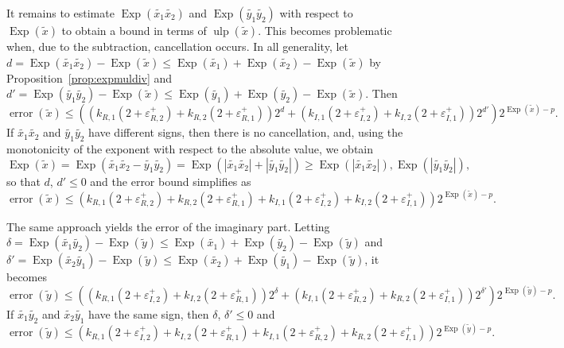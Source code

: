 \documentclass [11pt]{article}
\newcommand {\appro}[1]{\widetilde {#1}}
\newcommand {\Ulp}{{\operatorname {ulp}}}
\DeclareMathOperator{\Exp}{\operatorname {Exp}}
\newcommand{\error}{\operatorname {error}}
\renewcommand {\epsilon}{\varepsilon}
\renewcommand {\leq}{\leqslant}
\renewcommand {\geq}{\geqslant}
\begin{document}
It remains to estimate $\Exp (\appro {x_1} \appro {x_2})$ and
$\Exp (\appro {y_1} \appro {y_2})$ with respect to $\Exp (\appro x)$ to obtain
a bound in terms of $\Ulp (\appro x)$. This becomes problematic when, due
to the subtraction, cancellation occurs. In all generality, let
$d = \Exp (\appro {x_1} \appro {x_2}) - \Exp (\appro x)
\leq \Exp (\appro {x_1}) + \Exp (\appro {x_2}) - \Exp (\appro x)$
by Proposition~\ref {prop:expmuldiv} and
$d' = \Exp( \appro {y_1} \appro {y_2}) - \Exp (\appro x)
\leq \Exp (\appro {y_1}) + \Exp (\appro {y_2}) - \Exp (\appro x)$.
Then
\begin {equation}
\label {eq:propmulre}
\error( \appro x) \leq \left(
   \left( k_{R, 1} (2 + \epsilon_{R, 2}^+)
   + k_{R, 2} (2 + \epsilon_{R, 1}^+) \right) 2^d
   + \left( k_{I, 1} (2 + \epsilon_{I, 2}^+)
   + k_{I, 2} (2 + \epsilon_{I, 1}^+) \right) 2^{d'}
   \right) 2^{\Exp (\appro x) - p}.
\end {equation}
If $\appro {x_1} \appro {x_2}$ and $\appro {y_1} \appro {y_2}$ have different
signs, then there is no cancellation, and, using the monotonicity of the
exponent with respect to the absolute value, we obtain
\[
\Exp (\appro x) = \Exp (\appro {x_1} \appro {x_2} - \appro {y_1} \appro {y_2})
= \Exp (|\appro {x_1} \appro {x_2}| + |\appro {y_1} \appro {y_2}|)
\geq \Exp (|\appro {x_1} \appro {x_2}|), \Exp (|\appro {y_1} \appro {y_2}|),
\]
so that $d$, $d' \leq 0$ and the error bound simplifies as
\[
\error( \appro x) \leq \left(
   k_{R, 1} (2 + \epsilon_{R, 2}^+)
   + k_{R, 2} (2 + \epsilon_{R, 1}^+)
   + k_{I, 1} (2 + \epsilon_{I, 2}^+)
   + k_{I, 2} (2 + \epsilon_{I, 1}^+)
   \right) 2^{\Exp (\appro x) - p}.
\]

The same approach yields the error of the imaginary part. Letting
$\delta = \Exp (\appro {x_1} \appro {y_2}) - \Exp (\appro y)
\leq \Exp( \appro {x_1}) + \Exp (\appro {y_2}) - \Exp (\appro y)$ and
$\delta' = \Exp (\appro {x_2} \appro {y_1}) - \Exp (\appro {y})
\leq \Exp (\appro {x_2}) + \Exp (\appro {y_1}) - \Exp (\appro y)$,
it becomes
\begin {equation}
\label {eq:propmulim}
\error( \appro y) \leq \left(
   \left( k_{R, 1} (2 + \epsilon_{I, 2}^+)
   + k_{I, 2} (2 + \epsilon_{R, 1}^+) \right) 2^{\delta}
   + \left( k_{I, 1} (2 + \epsilon_{R, 2}^+)
   + k_{R, 2} (2 + \epsilon_{I, 1}^+) \right) 2^{\delta'}
   \right) 2^{\Exp (\appro y) - p}.
\end {equation}
If $\appro {x_1} \appro {y_2}$ and $\appro {x_2} \appro {y_1}$ have
the same sign, then $\delta$, $\delta' \leq 0$ and
\[
\error( \appro y) \leq \left(
   k_{R, 1} (2 + \epsilon_{I, 2}^+)
   + k_{I, 2} (2 + \epsilon_{R, 1}^+)
   + k_{I, 1} (2 + \epsilon_{R, 2}^+)
   + k_{R, 2} (2 + \epsilon_{I, 1}^+)
   \right) 2^{\Exp (\appro y) - p}.
\]
\end{document}
